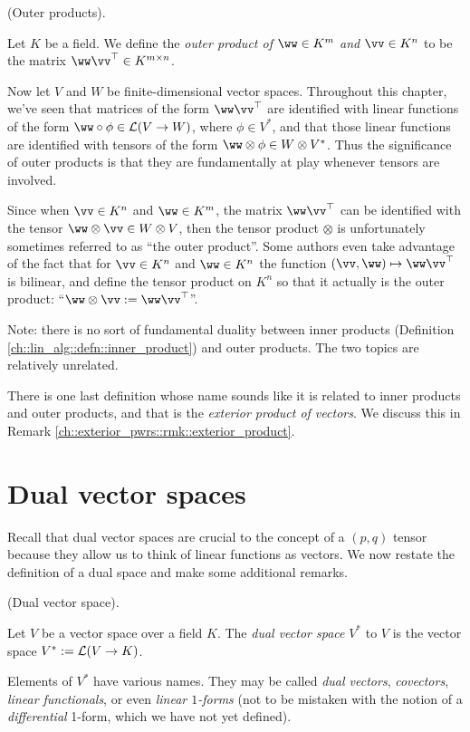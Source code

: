 \begin{defn}
\label{ch::motivated_intro::rmk::outer_products}
    (Outer products).

    Let $K$ be a field. We define the \textit{outer product of $\ww \in K^m$ and $\vv \in K^n$} to be the matrix $\ww \vv^\top \in K^{m \times n}$. 
    
    Now let $V$ and $W$ be finite-dimensional vector spaces. Throughout this chapter, we've seen that matrices of the form $\ww \vv^\top$ are identified with linear functions of the form $\ww \circ \phi \in \LLLL(V \rightarrow W)$, where $\phi \in V^*$, and that those linear functions are identified with tensors of the form $\ww \otimes \phi \in W \otimes V^*$. Thus the significance of outer products is that they are fundamentally at play whenever tensors are involved.
    
    Since when $\vv \in K^n$ and $\ww \in K^m$, the matrix $\ww \vv^\top$ can be identified with the tensor $\ww \otimes \vv \in W \otimes V$, then the tensor product $\otimes$ is unfortunately sometimes referred to as ``the outer product''. Some authors even take advantage of the fact that for $\vv \in K^n$ and $\ww \in K^n$ the function $(\vv, \ww) \mapsto \ww \vv^\top$ is bilinear, and define the tensor product on $K^n$ so that it actually is the outer product: ``$\ww \otimes \vv := \ww \vv^\top$''.

    Note: there is no sort of fundamental duality between inner products (Definition \ref{ch::lin_alg::defn::inner_product}) and outer products. The two topics are relatively unrelated.

    There is one last definition whose name sounds like it is related to inner products and outer products, and that is the \textit{exterior product of vectors}. We discuss this in Remark \ref{ch::exterior_pwrs::rmk::exterior_product}.
\end{defn}

\newpage

\section{Dual vector spaces}

Recall that dual vector spaces are crucial to the concept of a $(p, q)$ tensor because they allow us to think of linear functions as vectors. We now restate the definition of a dual space and make some additional remarks.

\begin{defn}
\label{ch::motivated_intro::defn::dual_space_2}
    (Dual vector space).
    
    Let $V$ be a vector space over a field $K$. The \textit{dual vector space} $V^*$ to $V$ is the vector space $V^* := \mathcal{L}(V \rightarrow K)$.

    Elements of $V^*$ have various names. They may be called \textit{dual vectors}, \textit{covectors}, \textit{linear functionals}, or even \textit{linear $1$-forms} (not to be mistaken with the notion of a \textit{differential} 1-form, which we have not yet defined).
\end{defn}

